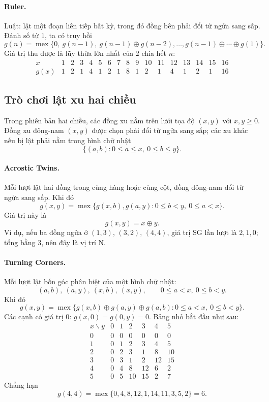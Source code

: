 \documentclass[11pt]{article}
\newcommand{\mex}{\operatorname{mex}}
\newcommand{\xor}{\mathbin{\oplus}}
\begin{document}
\paragraph{Ruler.}
Luật: lật một đoạn liên tiếp bất kỳ, trong đó đồng bên phải đổi từ ngửa sang
sấp. Đánh số từ \(1\), ta có truy hồi
\[
  g(n)=\mex\{0,\ g(n-1),\ g(n-1)\xor g(n-2),\ldots,
  g(n-1)\xor\cdots\xor g(1)\}.
\]
Giá trị thu được là lũy thừa lớn nhất của \(2\) chia hết \(n\):
\[
\begin{array}{c|cccccccccccccccc}
x&1&2&3&4&5&6&7&8&9&10&11&12&13&14&15&16\\ \hline
g(x)&1&2&1&4&1&2&1&8&1&2&1&4&1&2&1&16
\end{array}
\]

\subsection{Trò chơi lật xu hai chiều}

Trong phiên bản hai chiều, các đồng xu nằm trên lưới tọa độ \((x,y)\) với
\(x,y\ge0\). Đồng xu đông-nam \((x,y)\) được chọn phải đổi từ ngửa sang sấp;
các xu khác nếu bị lật phải nằm trong hình chữ nhật
\[
  \{(a,b):0\le a\le x,\ 0\le b\le y\}.
\]

\paragraph{Acrostic Twins.}
Mỗi lượt lật hai đồng trong cùng hàng hoặc cùng cột, đồng đông-nam đổi từ ngửa
sang sấp. Khi đó
\[
  g(x,y)=\mex\{g(x,b),g(a,y):0\le b<y,\ 0\le a<x\}.
\]
Giá trị này là
\[
  g(x,y)=x\xor y.
\]
Ví dụ, nếu ba đồng ngửa ở \((1,3)\), \((3,2)\), \((4,4)\), giá trị SG lần
lượt là \(2,1,0\); tổng bằng \(3\), nên đây là vị trí N.

\paragraph{Turning Corners.}
Mỗi lượt lật bốn góc phân biệt của một hình chữ nhật:
\[
  (a,b),\ (a,y),\ (x,b),\ (x,y),\qquad 0\le a<x,\ 0\le b<y.
\]
Khi đó
\[
  g(x,y)=\mex\{g(x,b)\xor g(a,y)\xor g(a,b):
  0\le a<x,\ 0\le b<y\}.
\]
Các cạnh có giá trị \(0\): \(g(x,0)=g(0,y)=0\). Bảng nhỏ bắt đầu như sau:
\[
\begin{array}{c|cccccc}
x\backslash y&0&1&2&3&4&5\\ \hline
0&0&0&0&0&0&0\\
1&0&1&2&3&4&5\\
2&0&2&3&1&8&10\\
3&0&3&1&2&12&15\\
4&0&4&8&12&6&2\\
5&0&5&10&15&2&7
\end{array}
\]
Chẳng hạn
\[
  g(4,4)=\mex\{0,4,8,12,1,14,11,3,5,2\}=6.
\]
\end{document}
